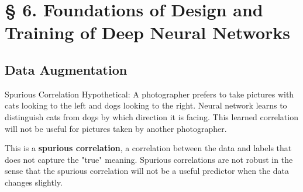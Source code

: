 \section{§ 6. Foundations of Design and Training of Deep Neural Networks}

\subsection{Data Augmentation}

\begin{frame}[allowframebreaks]

\begin{mydefinitionblock}{6.1}{Spurious Correlation}
    Hypothetical: A photographer prefers to take pictures with cats looking to the left and dogs looking to the right. Neural network learns to distinguish cats from dogs by which direction it is facing. This learned correlation will not be useful for pictures taken by another photographer.

    This is a \textbf{spurious correlation}, a correlation between the data and labels that does not capture the "true" meaning. Spurious correlations are not robust in the sense that the spurious correlation will not be a useful predictor when the data changes slightly.
\end{mydefinitionblock}

\end{frame}

